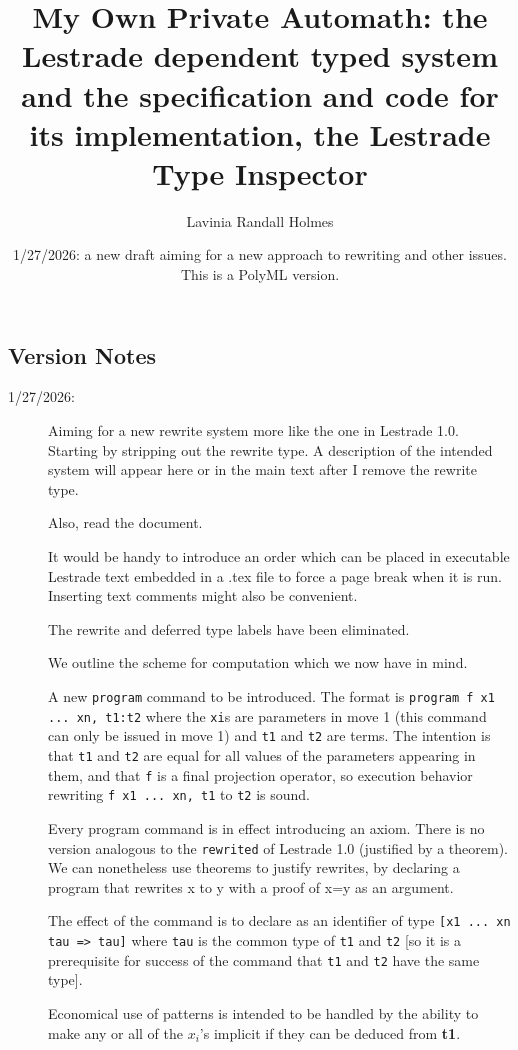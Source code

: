 \documentclass[12pt]{article}
\title{My Own Private Automath:  the Lestrade dependent typed system and the specification and code for its implementation, the Lestrade Type Inspector}
\author{Lavinia Randall Holmes}
\date{1/27/2026:  a new draft aiming for a new approach to rewriting and other issues.  This is a PolyML version.}
\begin{document}
\maketitle

\tableofcontents

\newpage

\subsection{Version Notes}

\begin{description}
\item[1/27/2026:]  Aiming for a new rewrite system more like the one in Lestrade 1.0.  Starting by stripping out the rewrite type.   A description of the intended system will appear here or in the main text after I remove the rewrite type.

Also, read the document.

It would be handy to introduce an order which can be placed in executable Lestrade text embedded in a .tex file to force a page break when it is run.  Inserting text comments might also be convenient.

The rewrite and deferred type labels have been eliminated.

We outline the scheme for computation which we now have in mind.

A new {\tt program} command to be introduced.  The format is {\tt program f x1 ... xn, t1:t2} where the {\tt xi}s are parameters in move 1 (this command can only be issued in move 1) and {\tt t1} and {\tt t2} are terms.
The intention is that {\tt t1} and {\tt t2} are equal for all values of the parameters appearing in them, and that {\tt f}
is a final projection operator, so execution behavior rewriting   {\tt f x1 ... xn, t1} to {\tt t2} is sound.

Every program command is in effect introducing an axiom.  There is no version analogous to the {\tt rewrited}
of Lestrade 1.0 (justified by a theorem).  We can nonetheless use theorems to justify rewrites, by declaring a program that rewrites x to y with a proof of x=y as an argument.

The effect of the command is to declare as an identifier of type {\tt [x1 ... xn tau => tau]} where {\tt tau} is the common type of {\tt t1} and {\tt t2} [so it is a prerequisite for success of the command that {\tt t1} and {\tt t2} have the same type].

Economical use of patterns is intended to be handled by the ability to make any or all of the $x_i$'s implicit if they can be deduced from {\bf t1}.




\end{description}
\end{document}
